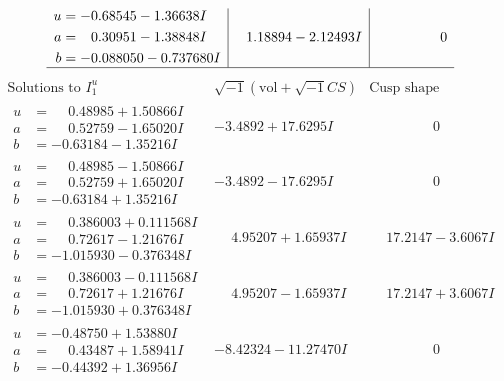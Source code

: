 \documentclass[1p]{elsarticle_modified}
\theoremstyle{definition}
\newcommand{\I}{\sqrt{-1}}
\begin{document}
$$\begin{array}{c|c|c}
\begin{aligned}
u &= -0.68545 - 1.36638 I \\
a &= \phantom{-}0.30951 - 1.38848 I \\
b &= -0.088050 - 0.737680 I\end{aligned}
 & \phantom{-}1.18894 - 2.12493 I & \phantom{-0.000000 } 0\\
 \hline 
 \end{array}$$\newpage$$\begin{array}{c|c|c}  
\text{Solutions to }I^u_{1}& \I (\text{vol} + \sqrt{-1}CS) & \text{Cusp shape}\\
 \hline 
\begin{aligned}
u &= \phantom{-}0.48985 + 1.50866 I \\
a &= \phantom{-}0.52759 - 1.65020 I \\
b &= -0.63184 - 1.35216 I\end{aligned}
 & -3.4892 + 17.6295 I & \phantom{-0.000000 } 0 \\ \hline\begin{aligned}
u &= \phantom{-}0.48985 - 1.50866 I \\
a &= \phantom{-}0.52759 + 1.65020 I \\
b &= -0.63184 + 1.35216 I\end{aligned}
 & -3.4892 - 17.6295 I & \phantom{-0.000000 } 0 \\ \hline\begin{aligned}
u &= \phantom{-}0.386003 + 0.111568 I \\
a &= \phantom{-}0.72617 - 1.21676 I \\
b &= -1.015930 - 0.376348 I\end{aligned}
 & \phantom{-}4.95207 + 1.65937 I & \phantom{-}17.2147 - 3.6067 I \\ \hline\begin{aligned}
u &= \phantom{-}0.386003 - 0.111568 I \\
a &= \phantom{-}0.72617 + 1.21676 I \\
b &= -1.015930 + 0.376348 I\end{aligned}
 & \phantom{-}4.95207 - 1.65937 I & \phantom{-}17.2147 + 3.6067 I \\ \hline\begin{aligned}
u &= -0.48750 + 1.53880 I \\
a &= \phantom{-}0.43487 + 1.58941 I \\
b &= -0.44392 + 1.36956 I\end{aligned}
 & -8.42324 - 11.27470 I & \phantom{-0.000000 } 0 \\ \hline\begin{aligned}

\end{aligned}
\end{array}$$
\end{document}
